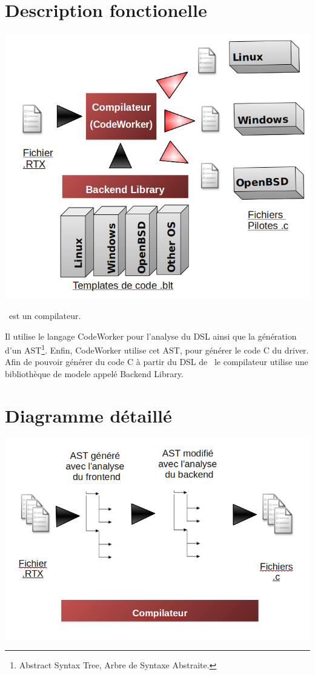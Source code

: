 \documentclass{rtxreport}
\begin{document}
\section{Description fonctionelle}

\includegraphics[width=\textwidth]{diagramme_general}

\rtx\ est un compilateur.

Il utilise le langage CodeWorker pour l'analyse du DSL ainsi que la génération
d'un AST\footnote{Abstract Syntax Tree, Arbre de Syntaxe Abstraite.}. Enfin,
CodeWorker utilise cet AST, pour générer le code C du driver. Afin de pouvoir
générer du code C à partir du DSL de \rtx\, le compilateur utilise une
bibliothèque de modele appelé Backend Library. %

\section{Diagramme détaillé}

\includegraphics[width=\textwidth]{diagramme_fonctionel}
\end{document}
